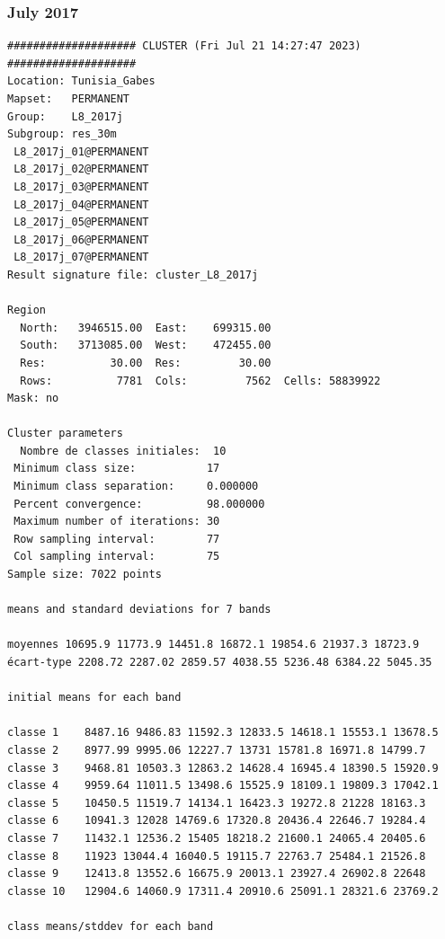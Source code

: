 \documentclass[environments,article,submit,pdftex,moreauthors]{Definitions/mdpi}
\begin{document}
\subsubsection[\appendixname~\thesubsubsection]{July 2017}
\begin{scriptsize}
\begin{verbatim}
#################### CLUSTER (Fri Jul 21 14:27:47 2023) ####################
Location: Tunisia_Gabes
Mapset:   PERMANENT
Group:    L8_2017j
Subgroup: res_30m
 L8_2017j_01@PERMANENT
 L8_2017j_02@PERMANENT
 L8_2017j_03@PERMANENT
 L8_2017j_04@PERMANENT
 L8_2017j_05@PERMANENT
 L8_2017j_06@PERMANENT
 L8_2017j_07@PERMANENT
Result signature file: cluster_L8_2017j

Region
  North:   3946515.00  East:    699315.00
  South:   3713085.00  West:    472455.00
  Res:          30.00  Res:         30.00
  Rows:          7781  Cols:         7562  Cells: 58839922
Mask: no

Cluster parameters
  Nombre de classes initiales: 	10
 Minimum class size:           17
 Minimum class separation:     0.000000
 Percent convergence:          98.000000
 Maximum number of iterations: 30
 Row sampling interval:        77
 Col sampling interval:        75
Sample size: 7022 points

means and standard deviations for 7 bands

moyennes 10695.9 11773.9 14451.8 16872.1 19854.6 21937.3 18723.9
écart-type 2208.72 2287.02 2859.57 4038.55 5236.48 6384.22 5045.35

initial means for each band

classe 1    8487.16 9486.83 11592.3 12833.5 14618.1 15553.1 13678.5
classe 2    8977.99 9995.06 12227.7 13731 15781.8 16971.8 14799.7
classe 3    9468.81 10503.3 12863.2 14628.4 16945.4 18390.5 15920.9
classe 4    9959.64 11011.5 13498.6 15525.9 18109.1 19809.3 17042.1
classe 5    10450.5 11519.7 14134.1 16423.3 19272.8 21228 18163.3
classe 6    10941.3 12028 14769.6 17320.8 20436.4 22646.7 19284.4
classe 7    11432.1 12536.2 15405 18218.2 21600.1 24065.4 20405.6
classe 8    11923 13044.4 16040.5 19115.7 22763.7 25484.1 21526.8
classe 9    12413.8 13552.6 16675.9 20013.1 23927.4 26902.8 22648
classe 10   12904.6 14060.9 17311.4 20910.6 25091.1 28321.6 23769.2

class means/stddev for each band


\end{verbatim}
\end{scriptsize}
\end{document}

